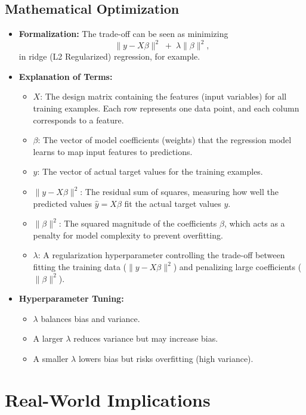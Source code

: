 \documentclass{article}
\begin{document}
\subsection{Mathematical Optimization}
\begin{itemize}
    \item \textbf{Formalization:} The trade-off can be seen as minimizing
    \[
    \|y - X\beta\|^2 \;+\; \lambda \|\beta\|^2,
    \]
    in ridge (L2 Regularized) regression, for example.
    \item \textbf{Explanation of Terms:}
    \begin{itemize}
        \item \( X \): The design matrix containing the features (input variables) for all training examples. Each row represents one data point, and each column corresponds to a feature.
        \item \( \beta \): The vector of model coefficients (weights) that the regression model learns to map input features to predictions.
        \item \( y \): The vector of actual target values for the training examples.
        \item \( \|y - X\beta\|^2 \): The residual sum of squares, measuring how well the predicted values \( \hat{y} = X\beta \) fit the actual target values \( y \).
        \item \( \|\beta\|^2 \): The squared magnitude of the coefficients \( \beta \), which acts as a penalty for model complexity to prevent overfitting.
        \item \( \lambda \): A regularization hyperparameter controlling the trade-off between fitting the training data (\( \|y - X\beta\|^2 \)) and penalizing large coefficients (\( \|\beta\|^2 \)).
    \end{itemize}
    \item \textbf{Hyperparameter Tuning:}
    \begin{itemize}
        \item $\lambda$ balances bias and variance.
        \item A larger $\lambda$ reduces variance but may increase bias.
        \item A smaller $\lambda$ lowers bias but risks overfitting (high variance).
    \end{itemize}
\end{itemize}

\section{Real-World Implications}
\end{document}
